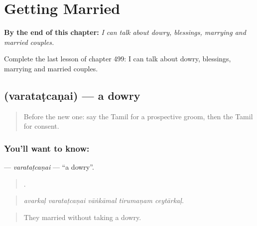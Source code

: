 
\chapter{Getting Married}
\label{ch:ta-getting-married}

\begin{chapteropening}
\textbf{By the end of this chapter:} \emph{I can talk about dowry, blessings, marrying and married couples.}

Complete the last lesson of chapter 499: I can talk about dowry, blessings, marrying and married couples.
\end{chapteropening}

\section[\texorpdfstring{\ta{வரதட்சணை} (varataṭcaṇai)}{வரதட்சணை (varataṭcaṇai)}]{ (varataṭcaṇai) — a dowry}

\label{lesson:TA-C499-varatatcanai}



\begin{quote}
Before the new one: say the Tamil for a prospective groom, then the Tamil for consent.
\end{quote}

\subsection*{You'll want to know: }
\textbf{} — \emph{varataṭcaṇai} — \textquotedblleft{}a dowry\textquotedblright{}.

\begin{quote}
    .
\end{quote}

\begin{quote}
\emph{avarkaḷ varataṭcaṇai vāṅkāmal tirumaṇam ceytārkaḷ.}
\end{quote}

\begin{quote}
They married without taking a dowry.
\end{quote}

